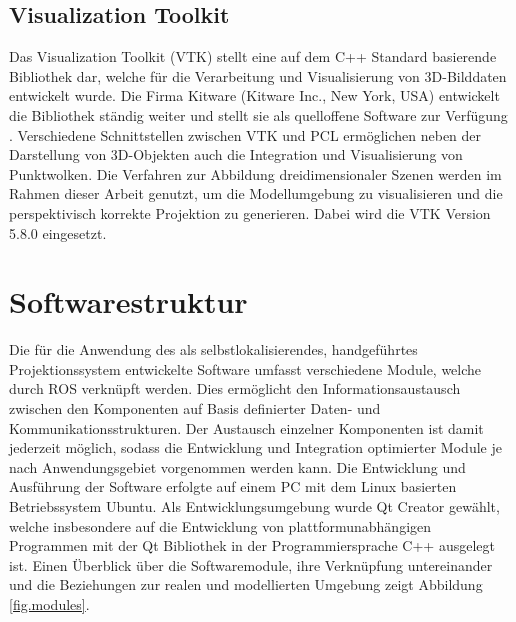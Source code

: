 \subsection{Visualization Toolkit}
\label{chap.vtk}
Das Visualization Toolkit (VTK) stellt eine auf dem C++ Standard basierende Bibliothek dar, welche für die Verarbeitung und Visualisierung von 3D-Bilddaten entwickelt wurde. Die Firma Kitware (Kitware Inc., New York, USA) entwickelt die Bibliothek ständig weiter und stellt sie als quelloffene Software zur Verfügung \cite{VTK}. Verschiedene Schnittstellen zwischen VTK und PCL ermöglichen neben der Darstellung von 3D-Objekten auch die Integration und Visualisierung von Punktwolken. Die Verfahren zur Abbildung dreidimensionaler Szenen werden im Rahmen dieser Arbeit genutzt, um die Modellumgebung zu visualisieren und die perspektivisch korrekte Projektion zu generieren. Dabei wird die VTK Version 5.8.0 eingesetzt.


\prever{
}

\prever{
}
\section{Softwarestruktur}
\label{chap.softwarestruct}
Die für die Anwendung des  als selbstlokalisierendes, handgeführtes Projektionssystem entwickelte Software umfasst verschiedene Module, welche durch ROS verknüpft werden. Dies ermöglicht den Informationsaustausch zwischen den Komponenten auf Basis definierter Daten- und Kommunikationsstrukturen. Der Austausch einzelner Komponenten ist damit jederzeit möglich, sodass die Entwicklung und Integration optimierter Module je nach Anwendungsgebiet vorgenommen werden kann. Die Entwicklung und Ausführung der Software erfolgte auf einem PC mit dem Linux basierten Betriebssystem Ubuntu. Als Entwicklungsumgebung wurde Qt Creator gewählt, welche insbesondere auf die Entwicklung von plattformunabhängigen Programmen mit der Qt Bibliothek in der Programmiersprache C++ ausgelegt ist.
Einen Überblick über die Softwaremodule, ihre Verknüpfung untereinander und die Beziehungen zur realen und modellierten Umgebung zeigt Abbildung \ref{fig.modules}.\\

